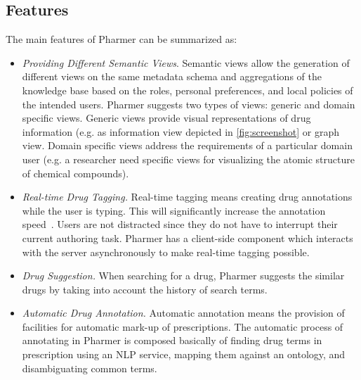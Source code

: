 \documentclass[10pt, conference, compsocconf]{IEEEtran}
\begin{document}
\subsection{Features}
The main features of Pharmer can be summarized as:
\begin{itemize}
	\item \emph{Providing Different Semantic Views}.
	Semantic views allow the generation of different views on the same metadata schema and aggregations of the knowledge base based on the roles, personal preferences, and local policies of the intended users.
	Pharmer suggests two types of views: generic and domain specific views.
	Generic views provide visual representations of drug information (e.g. as information view depicted in \autoref{fig:screenshot} or graph view.
	Domain specific views address the requirements of a particular domain user (e.g. a researcher need specific views for visualizing the atomic structure of chemical compounds).
	\item \emph{Real-time Drug Tagging.}
	Real-time tagging means creating drug annotations while the user is typing.
	This will significantly increase the annotation speed~\cite{OCA,Reflect}.
	Users are not distracted since they do not have to interrupt their current authoring task.
	Pharmer has a client-side component which interacts with the server asynchronously to make real-time tagging possible.
	\item \emph{Drug Suggestion.}
		When searching for a drug, Pharmer suggests the similar drugs by taking into account the history of search terms.
    \item \emph{Automatic Drug Annotation.}
    Automatic annotation means the provision of facilities for automatic mark-up of prescriptions.
    The automatic process of annotating in Pharmer is composed basically of finding drug terms in prescription using an NLP service, mapping them against an ontology, and disambiguating common terms.
\end{itemize}
\end{document}
